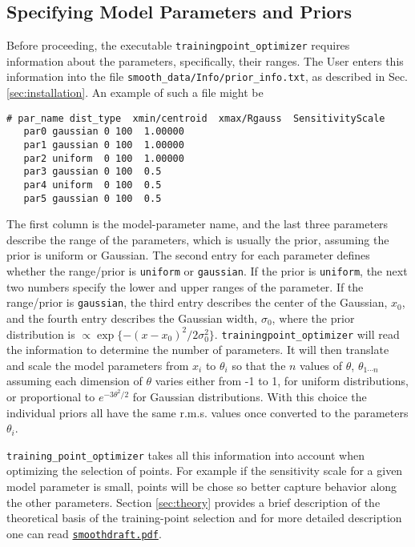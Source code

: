 \documentclass[UserManual.tex]{subfiles}
\begin{document}
\subsection{Specifying Model Parameters and Priors}\label{subsec:priorinfo}
Before proceeding, the executable {\tt trainingpoint\_optimizer} requires information about the parameters, specifically, their ranges. The User enters this information into the file {\tt smooth\_data/Info/prior\_info.txt}, as described in Sec. \ref{sec:installation}. An example of such a file might be
{\tt\begin{verbatim}
# par_name dist_type  xmin/centroid  xmax/Rgauss  SensitivityScale
   par0 gaussian 0 100  1.00000
   par1 gaussian 0 100  1.00000
   par2 uniform  0 100  1.00000
   par3 gaussian 0 100  0.5
   par4 uniform  0 100  0.5
   par5 gaussian 0 100  0.5
\end{verbatim}
}
The first column is the model-parameter name, and the last three parameters describe the range of the parameters, which is usually the prior, assuming the prior is uniform or Gaussian. The second entry for each parameter defines whether the range/prior is {\tt uniform} or {\tt gaussian}. If the prior is {\tt uniform}, the next two numbers specify the lower and upper ranges of the parameter. If the range/prior is {\tt gaussian}, the third entry describes the center of the Gaussian, $x_0$, and the fourth entry describes the Gaussian width, $\sigma_0$, where the prior distribution is $\propto \exp\{-(x-x_0)^2/2\sigma_0^2\}$. {\tt trainingpoint\_optimizer} will read the information to determine the number of parameters. It will then translate and scale the model parameters from $x_i$ to $\theta_i$ so that the $n$ values of $\theta$, $\theta_{1\cdots n}$ assuming each dimension of $\theta$ varies either from -1 to 1, for uniform distributions, or proportional to $e^{-3\theta^2/2}$ for Gaussian distributions. With this choice the individual priors all have the same r.m.s. values once converted to the parameters $\theta_i$.

{\tt training\_point\_optimizer} takes all this information into account when optimizing the selection of points. For example if the sensitivity scale for a given model parameter is small, points will be chose so better capture behavior along the other parameters. Section \ref{sec:theory} provides a brief description of the theoretical basis of the training-point selection and for more detailed description one can read \href{./smoothdraft.pdf}{{\tt smoothdraft.pdf}}.
\end{document}
